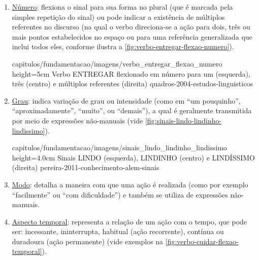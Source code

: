 \begin{enumerate}
\begin{enumerate}
            {capitulos/fundamentacao/imagens/verbo_entregar_deixis} %
            {height=5cm} %
            {Verbo ENTREGAR flexionado entre as pessoas EU e VOCÊ (esquerda) e ELE 1 e ELE 2 (direita)} %
            {quadros-2004-estudos-linguisticos} %

        
        \item \underline{Número}: flexiona o sinal para sua forma no plural (que é marcada pela simples repetição do sinal) ou pode indicar a existência de múltiplos referentes no discurso (na qual o verbo direciona-se a ação para dois, três ou mais pontos estabelecidos no espaço ou para uma referência generalizada que inclui todos eles, conforme ilustra a \autoref{fig:verbo-entregar-flexao-numero}).

            {capitulos/fundamentacao/imagens/verbo_entregar_flexao_numero} %
            {height=5cm} %
            {Verbo ENTREGAR flexionado em número para um (esquerda), três (centro) e múltiplos referentes (direita)} %
            {quadros-2004-estudos-linguisticos} %


        \item \underline{Grau}: indica variação de grau ou intensidade (como em ``um pouquinho'', ``aproximadamente'', ``muito'', ou ``demais''), a qual é geralmente transmitida por meio de expressões não-manuais (vide \autoref{fig:sinais-lindo-lindinho-lindissimo}).
    
            {capitulos/fundamentacao/imagens/sinais_lindo_lindinho_lindissimo} %
            {height=4.0cm} %
            {Sinais LINDO (esquerda), LINDINHO (centro) e LINDÍSSIMO (direita)} %
            {pereira-2011-conhecimento-alem-sinais} %


        \item \underline{Modo}: detalha a maneira com que uma ação é realizada (como por exemplo ``facilmente'' ou ``com dificuldade'') e também se utiliza de expressões não-manuais.

        
        \item \underline{Aspecto temporal}: representa a relação de um ação com o tempo, que pode ser: incessante, ininterrupta, habitual (ação recorrente), contínua ou duradoura (ação permanente) (vide exemplos na \autoref{fig:verbo-cuidar-flexao-temporal}).


\end{enumerate}
\end{enumerate}
